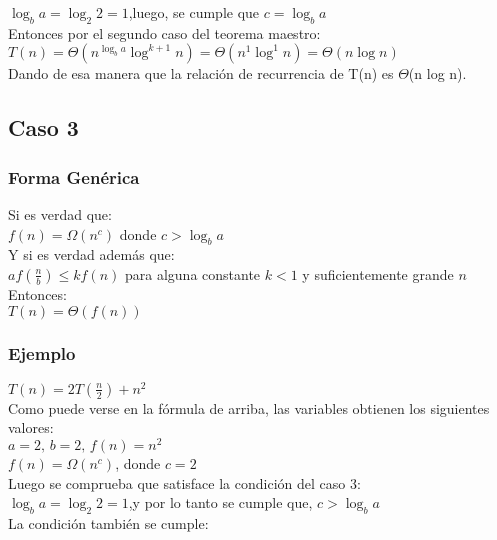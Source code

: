 \documentclass{article} %
\begin{document}
${\displaystyle \log _{b}a=\log _{2}2=1}$,luego, se cumple que ${\displaystyle c=\log _{b}a}$\\
Entonces por el segundo caso del teorema maestro:\\

${\displaystyle T(n)=\Theta \left(n^{\log _{b}a}\log ^{k+1}n\right)=\Theta \left(n^{1}\log ^{1}n\right)=\Theta \left(n\log n\right)}$\\
Dando de esa manera que la relación de recurrencia de T(n) es $\Theta$(n log n).

\subsection{Caso 3}
\subsubsection{Forma Genérica}
Si es verdad que:\\

${\displaystyle f(n)=\Omega \left(n^{c}\right)}$ donde ${\displaystyle c>\log _{b}a}$\\
Y si es verdad además que:\\

${\displaystyle af\left({\frac {n}{b}}\right)\leq kf(n)}$ para alguna constante ${\displaystyle k<1}$ y suficientemente grande ${\displaystyle n}$\\
Entonces:\\

${\displaystyle T\left(n\right)=\Theta \left(f(n)\right)}$
\subsubsection{Ejemplo}
${\displaystyle T(n)=2T\left({\frac {n}{2}}\right)+n^{2}}$\\
Como puede verse en la fórmula de arriba, las variables obtienen los siguientes valores:\\

${\displaystyle a=2,\,b=2,\,f(n)=n^{2}}$\\
${\displaystyle f(n)=\Omega \left(n^{c}\right)}$, donde ${\displaystyle c=2}$\\
Luego se comprueba que satisface la condición del caso 3:\\

${\displaystyle \log _{b}a=\log _{2}2=1}$,y por lo tanto se cumple que, ${\displaystyle c>\log _{b}a}$\\
La condición también se cumple:\\
\end{document}
